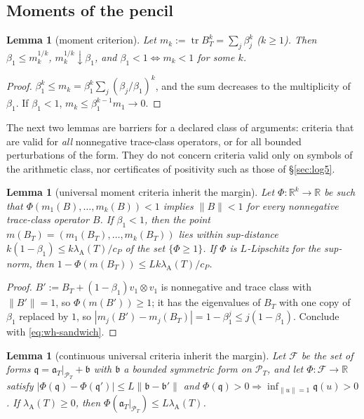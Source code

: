 \documentclass[11pt]{amsart}
\newtheorem{lemma}[theorem]{Lemma}
\theoremstyle{definition}
\theoremstyle{remark}
\newcommand{\R}{\mathbb R}
\newcommand{\PT}{\mathcal P_T}
\newcommand{\lamA}{\lambda_{\mathrm A}(T)}
\begin{document}
\subsection{Moments of the pencil}\label{subsec:wh-moments}

\begin{lemma}[moment criterion]\label{lem:wh-mom}
Let $m_k:=\operatorname{tr}B_T^k=\sum_j\beta_j^k$ ($k\ge1$). Then $\beta_1\le m_k^{1/k}$, $m_k^{1/k}\downarrow\beta_1$, and
$\beta_1<1\iff m_k<1$ for some $k$.
\end{lemma}

\begin{proof}
$\beta_1^k\le m_k=\beta_1^k\sum_j(\beta_j/\beta_1)^k$, and the sum decreases to the multiplicity of $\beta_1$. If
$\beta_1<1$, $m_k\le\beta_1^{k-1}m_1\to0$.
\end{proof}

The next two lemmas are barriers for a declared class of arguments: criteria that are valid for \emph{all}
nonnegative trace-class operators, or for all bounded perturbations of the form. They do not concern criteria
valid only on symbols of the arithmetic class, nor certificates of positivity such as those of
\S\ref{sec:log5}.

\begin{lemma}[universal moment criteria inherit the margin]\label{lem:wh-T}
Let $\Phi:\R^k\to\R$ be such that $\Phi(m_1(B),\dots,m_k(B))<1$ implies $\|B\|<1$ for every nonnegative trace-class
operator $B$. If $\beta_1<1$, then the point $m(B_T)=(m_1(B_T),\dots,m_k(B_T))$ lies within sup-distance
$k(1-\beta_1)\le k\lamA/c_P$ of the set $\{\Phi\ge1\}$. If $\Phi$ is $L$-Lipschitz for the sup-norm, then
$1-\Phi(m(B_T))\le Lk\lamA/c_P$.
\end{lemma}

\begin{proof}
$B':=B_T+(1-\beta_1)v_1\otimes v_1$ is nonnegative and trace class with $\|B'\|=1$, so $\Phi(m(B'))\ge1$; it has the
eigenvalues of $B_T$ with one copy of $\beta_1$ replaced by $1$, so $|m_j(B')-m_j(B_T)|=1-\beta_1^j\le j(1-\beta_1)$. Conclude
with \eqref{eq:wh-sandwich}.
\end{proof}

\begin{lemma}[continuous universal criteria inherit the margin]\label{lem:wh-Tprime}
Let $\mathcal F$ be the set of forms $\mathfrak q=\mathfrak a_T|_{\PT}+\mathfrak b$ with $\mathfrak b$ a bounded symmetric form on $\PT$, and
let $\Phi:\mathcal F\to\R$ satisfy $|\Phi(\mathfrak q)-\Phi(\mathfrak q')|\le L\|\mathfrak b-\mathfrak b'\|$ and
$\Phi(\mathfrak q)>0\Rightarrow\inf_{\|u\|=1}\mathfrak q(u)>0$. If $\lamA\ge0$, then $\Phi(\mathfrak a_T|_{\PT})\le L\lamA$.
\end{lemma}
\end{document}
